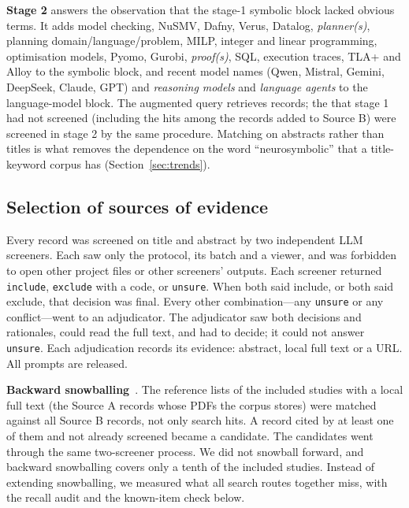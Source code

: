 \textbf{Stage 2} answers the observation that the stage-1 symbolic block lacked obvious terms. It adds model checking, NuSMV, Dafny, Verus, Datalog, \emph{planner(s)}, planning domain/language/problem, MILP, integer and linear programming, optimisation models, Pyomo, Gurobi, \emph{proof(s)}, SQL, execution traces, TLA+ and Alloy to the symbolic block, and recent model names (Qwen, Mistral, Gemini, DeepSeek, Claude, GPT) and \emph{reasoning models} and \emph{language agents} to the language-model block. The augmented query retrieves  records; the  that stage 1 had not screened (including the hits among the records added to Source B) were screened in stage 2 by the same procedure. Matching on abstracts rather than titles is what removes the dependence on the word ``neurosymbolic'' that a title-keyword corpus has (Section~\ref{sec:trends}).

\subsection{Selection of sources of evidence}
\label{sec:method-selection}
Every record was screened on title and abstract by two independent LLM screeners. Each saw only the protocol, its batch and a viewer, and was forbidden to open other project files or other screeners' outputs. Each screener returned \texttt{include}, \texttt{exclude} with a code, or \texttt{unsure}. When both said include, or both said exclude, that decision was final. Every other combination---any \texttt{unsure} or any conflict---went to an adjudicator. The adjudicator saw both decisions and rationales, could read the full text, and had to decide; it could not answer \texttt{unsure}. Each adjudication records its evidence: abstract, local full text or a URL. All prompts are released.

\textbf{Backward snowballing}~\cite{wohlin2014guidelines}. The reference lists of the  included studies with a local full text (the Source A records whose PDFs the corpus stores) were matched against all Source B records, not only search hits. A record cited by at least one of them and not already screened became a candidate. The  candidates went through the same two-screener process. We did not snowball forward, and backward snowballing covers only a tenth of the included studies. Instead of extending snowballing, we measured what all search routes together miss, with the recall audit and the known-item check below.

